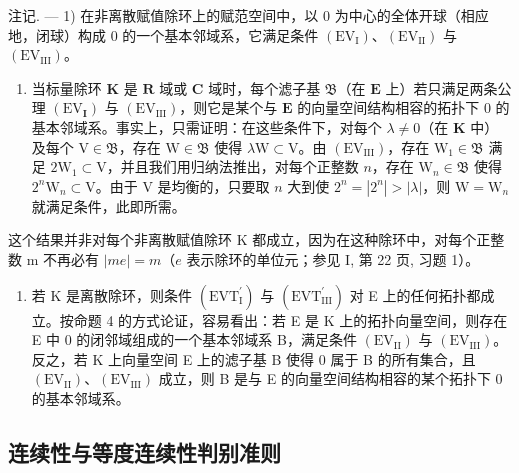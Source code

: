 注记. --- 1) 在非离散赋值除环上的赋范空间中，以 0 为中心的全体开球（相应地，闭球）构成 0 的一个基本邻域系，它满足条件 \((\mathrm{EV}_{\mathrm{I}})\)、\((\mathrm{EV}_{\mathrm{II}})\) 与 \((\mathrm{EV}_{\mathrm{III}})\)。

\begin{enumerate}
\def\labelenumi{\arabic{enumi})}
\setcounter{enumi}{1}
\tightlist
\item
  当标量除环 \(\mathbf{K}\) 是 \(\mathbf{R}\) 域或 \(\mathbf{C}\) 域时，每个滤子基 \(\mathfrak{B}\)（在 \(\mathbf{E}\) 上）若只满足两条公理 \((\mathrm{EV}_{\mathbf{I}})\) 与 \((\mathrm{EV}_{\mathrm{III}})\)，则它是某个与 \(\mathbf{E}\) 的向量空间结构相容的拓扑下 0 的基本邻域系。事实上，只需证明：在这些条件下，对每个 \(\lambda \neq 0\)（在 \(\mathbf{K}\) 中）及每个 \(\mathrm{V} \in \mathfrak{B}\)，存在 \(\mathrm{W} \in \mathfrak{B}\) 使得 \(\lambda \mathrm{W} \subset \mathrm{V}\)。由 \((\mathrm{EV}_{\mathrm{III}})\)，存在 \(\mathrm{W}_{1} \in \mathfrak{B}\) 满足 \(2\mathrm{W}_{1} \subset \mathrm{V}\)，并且我们用归纳法推出，对每个正整数 \(n\)，存在 \(\mathrm{W}_{n} \in \mathfrak{B}\) 使得 \(2^{n}\mathrm{W}_{n} \subset \mathrm{V}\)。由于 \(\mathrm{V}\) 是均衡的，只要取 \(n\) 大到使 \(2^{n} = |2^{n}| > |\lambda|\)，则 \(\mathrm{W} = \mathrm{W}_{n}\) 就满足条件，此即所需。
\end{enumerate}

这个结果并非对每个非离散赋值除环 K 都成立，因为在这种除环中，对每个正整数 m 不再必有 \(|me| = m\)（\(e\) 表示除环的单位元；参见 I, 第 22 页, 习题 1）。

\begin{enumerate}
\def\labelenumi{\arabic{enumi})}
\setcounter{enumi}{2}
\tightlist
\item
  若 K 是离散除环，则条件 \((\mathrm{EVT}_{\mathrm{I}}^{\prime})\) 与 \((\mathrm{EVT}_{\mathrm{III}}^{\prime})\) 对 E 上的任何拓扑都成立。按命题 4 的方式论证，容易看出：若 E 是 K 上的拓扑向量空间，则存在 E 中 0 的闭邻域组成的一个基本邻域系 B，满足条件 \((\mathrm{EV}_{\mathrm{II}})\) 与 \((\mathrm{EV}_{\mathrm{III}})\)。反之，若 K 上向量空间 E 上的滤子基 B 使得 0 属于 B 的所有集合，且 \((\mathrm{EV}_{\mathrm{II}})\)、\((\mathrm{EV}_{\mathrm{III}})\) 成立，则 B 是与 E 的向量空间结构相容的某个拓扑下 0 的基本邻域系。
\end{enumerate}

\subsection{连续性与等度连续性判别准则}

